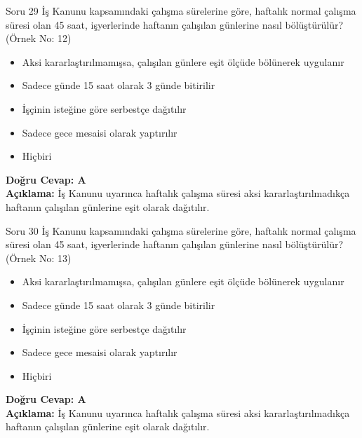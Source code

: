 \documentclass[12pt,a4paper]{article}
\begin{document}
\begin{testcard}{Soru 29}
    İş Kanunu kapsamındaki çalışma sürelerine göre, haftalık normal çalışma süresi olan 45 saat, işyerlerinde haftanın çalışılan günlerine nasıl bölüştürülür? (Örnek No: 12)
    \begin{itemize}
        \item[A)] Aksi kararlaştırılmamışsa, çalışılan günlere eşit ölçüde bölünerek uygulanır
        \item[B)] Sadece günde 15 saat olarak 3 günde bitirilir
        \item[C)] İşçinin isteğine göre serbestçe dağıtılır
        \item[D)] Sadece gece mesaisi olarak yaptırılır
        \item[E)] Hiçbiri
    \end{itemize}
    \tcblower
    \textbf{Doğru Cevap: A} \\
    \textbf{Açıklama:} İş Kanunu uyarınca haftalık çalışma süresi aksi kararlaştırılmadıkça haftanın çalışılan günlerine eşit olarak dağıtılır.
\end{testcard}

\begin{testcard}{Soru 30}
    İş Kanunu kapsamındaki çalışma sürelerine göre, haftalık normal çalışma süresi olan 45 saat, işyerlerinde haftanın çalışılan günlerine nasıl bölüştürülür? (Örnek No: 13)
    \begin{itemize}
        \item[A)] Aksi kararlaştırılmamışsa, çalışılan günlere eşit ölçüde bölünerek uygulanır
        \item[B)] Sadece günde 15 saat olarak 3 günde bitirilir
        \item[C)] İşçinin isteğine göre serbestçe dağıtılır
        \item[D)] Sadece gece mesaisi olarak yaptırılır
        \item[E)] Hiçbiri
    \end{itemize}
    \tcblower
    \textbf{Doğru Cevap: A} \\
    \textbf{Açıklama:} İş Kanunu uyarınca haftalık çalışma süresi aksi kararlaştırılmadıkça haftanın çalışılan günlerine eşit olarak dağıtılır.
\end{testcard}
\end{document}
